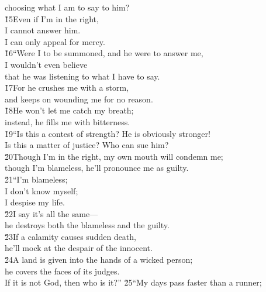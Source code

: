 \begin{poetry}
\poemll    choosing what I am to say to him? \\
\poeml \v{15}Even if I'm in the right, \\
\poemll    I cannot answer him. \\
\poemlll       I can only appeal for mercy. \\
\poeml \v{16}``Were I to be summoned, and he were to answer me, \\
\poemll    I wouldn't even believe \\
\poemlll       that he was listening to what I have to say. \\
\poeml \v{17}For he crushes me with a storm, \\
\poemll    and keeps on wounding me for no reason. \\
\poeml \v{18}He won't let me catch my breath; \\
\poemll    instead, he fills me with bitterness. \\
\poeml \v{19}``Is this a contest of strength? He is obviously stronger! \\
\poemll    Is this a matter of justice? Who can sue him? \\
\poeml \v{20}Though I'm in the right, my own mouth will condemn me; \\
\poemll    though I'm blameless, he'll pronounce me as guilty. \\
\poeml \v{21}``I'm blameless; \\
\poemll    I don't know myself; \\
\poemlll       I despise my life. \\
\poeml \v{22}I say it's all the same--- \\
\poemll    he destroys both the blameless and the guilty. \\
\poeml \v{23}If a calamity causes sudden death, \\
\poemll    he'll mock at the despair of the innocent. \\
\poeml \v{24}A land is given into the hands of a wicked person; \\
\poemll    he covers the faces of its judges. \\
\poemlll       If it is not God, then who is it?''
\poeml \v{25}``My days pass faster than a runner; \\

\end{poetry}

